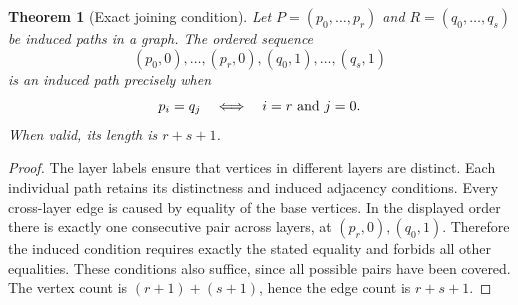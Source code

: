 \documentclass[11pt,a4paper]{article}
\newtheorem{theorem}{Theorem}[section]
\theoremstyle{definition}
\theoremstyle{remark}
\begin{document}
\begin{theorem}[Exact joining condition]\label{thm:join}
Let $P=(p_0,\ldots,p_r)$ and $R=(q_0,\ldots,q_s)$ be induced paths in a graph. The ordered sequence
\[
(p_0,0),\ldots,(p_r,0),(q_0,1),\ldots,(q_s,1)
\]
is an induced path precisely when
\[
p_i=q_j\quad\Longleftrightarrow\quad i=r\ \hbox{and}\ j=0.
\]
When valid, its length is $r+s+1$.
\end{theorem}
\begin{proof}
The layer labels ensure that vertices in different layers are distinct. Each individual path retains its distinctness and induced adjacency conditions. Every cross-layer edge is caused by equality of the base vertices. In the displayed order there is exactly one consecutive pair across layers, at $(p_r,0),(q_0,1)$. Therefore the induced condition requires exactly the stated equality and forbids all other equalities. These conditions also suffice, since all possible pairs have been covered. The vertex count is $(r+1)+(s+1)$, hence the edge count is $r+s+1$.
\end{proof}
\end{document}
